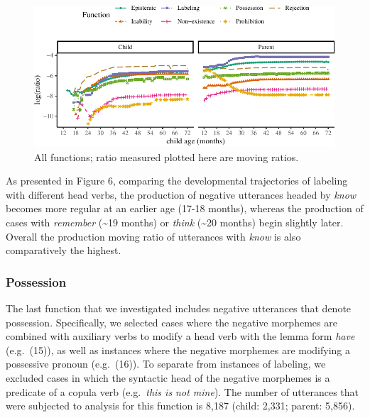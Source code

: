 \documentclass[10pt, letterpaper]{article}
\newenvironment{CodeChunk}{}{}
\begin{document}
\begin{figure}[h!]

\begin{CodeChunk}


\begin{center}\includegraphics{figs/all-1} \end{center}

\end{CodeChunk}

\caption[This image spans both columns]{All functions; ratio measured plotted here are moving ratios.}\label{fig:all}
\end{figure}

As presented in Figure 6, comparing the developmental trajectories of
labeling with different head verbs, the production of negative
utterances headed by \emph{know} becomes more regular at an earlier age
(17-18 months), whereas the production of cases with \emph{remember}
(\textasciitilde19 months) or \emph{think} (\textasciitilde20 months)
begin slightly later. Overall the production moving ratio of utterances
with \emph{know} is also comparatively the highest.

\hypertarget{possession}{%
\subsubsection{Possession}\label{possession}}

The last function that we investigated includes negative utterances that
denote possession. Specifically, we selected cases where the negative
morphemes are combined with auxiliary verbs to modify a head verb with
the lemma form \emph{have} (e.g.~(15)), as well as instances where the
negative morphemes are modifying a possessive pronoun (e.g.~(16)). To
separate from instances of labeling, we excluded cases in which the
syntactic head of the negative morphemes is a predicate of a copula verb
(e.g.~\emph{this is not mine}). The number of utterances that were
subjected to analysis for this function is 8,187 (child: 2,331; parent:
5,856).
\end{document}

